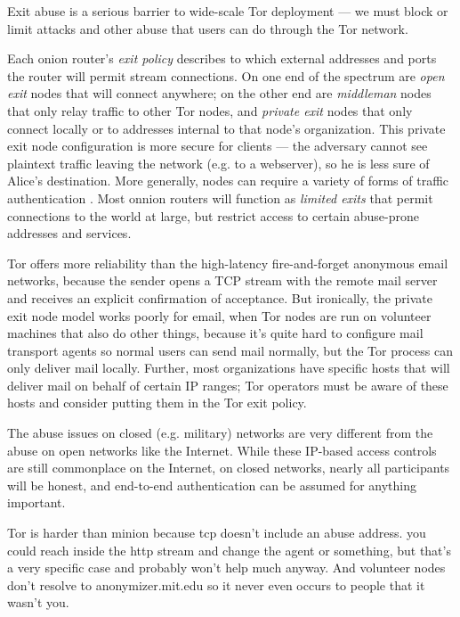 \documentclass[times,10pt,twocolumn]{article}
\begin{document}
\label{subsec:exitpolicies}

Exit abuse is a serious barrier to wide-scale Tor deployment --- we
must block or limit attacks and other abuse that users can do through
the Tor network.

Each onion router's \emph{exit policy} describes to which external
addresses and ports the router will permit stream connections. On one end
of the spectrum are \emph{open exit} nodes that will connect anywhere;
on the other end are \emph{middleman} nodes that only relay traffic to
other Tor nodes, and \emph{private exit} nodes that only connect locally
or to addresses internal to that node's organization. 
This private exit
node configuration is more secure for clients --- the adversary cannot
see plaintext traffic leaving the network (e.g. to a webserver), so he
is less sure of Alice's destination. More generally, nodes can require
a variety of forms of traffic authentication \cite{onion-discex00}.
Most onnion routers will function as \emph{limited exits} that permit
connections to the world at large, but restrict access to certain abuse-prone
addresses and services.

Tor offers more reliability than the high-latency fire-and-forget
anonymous email networks, because the sender opens a TCP stream
with the remote mail server and receives an explicit confirmation of
acceptance. But ironically, the private exit node model works poorly for
email, when Tor nodes are run on volunteer machines that also do other
things, because it's quite hard to configure mail transport agents so
normal users can send mail normally, but the Tor process can only deliver
mail locally. Further, most organizations have specific hosts that will
deliver mail on behalf of certain IP ranges; Tor operators must be aware
of these hosts and consider putting them in the Tor exit policy.

The abuse issues on closed (e.g. military) networks are very different
from the abuse on open networks like the Internet. While these IP-based
access controls are still commonplace on the Internet, on closed networks,
nearly all participants will be honest, and end-to-end authentication
can be assumed for anything important.

Tor is harder than minion because tcp doesn't include an abuse
address. you could reach inside the http stream and change the agent
or something, but that's a very specific case and probably won't help
much anyway.
And volunteer nodes don't resolve to anonymizer.mit.edu so it never
even occurs to people that it wasn't you.
\end{document}
